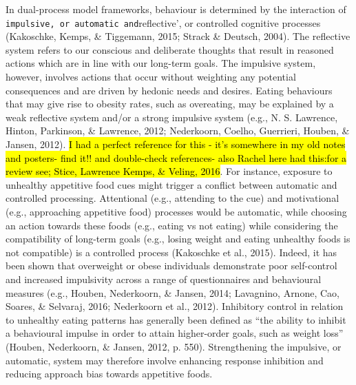 \documentclass[man,floatsintext]{apa6}
\begin{document}
\par

In dual-process model frameworks, behaviour is determined by the
interaction of
\texttt{impulsive\textquotesingle{},\ or\ automatic\ and}reflective', or
controlled cognitive processes (Kakoschke, Kemps, \& Tiggemann, 2015;
Strack \& Deutsch, 2004). The reflective system refers to our conscious
and deliberate thoughts that result in reasoned actions which are in
line with our long-term goals. The impulsive system, however, involves
actions that occur without weighting any potential consequences and are
driven by hedonic needs and desires. Eating behaviours that may give
rise to obesity rates, such as overeating, may be explained by a weak
reflective system and/or a strong impulsive system (e.g., N. S.
Lawrence, Hinton, Parkinson, \& Lawrence, 2012; Nederkoorn, Coelho,
Guerrieri, Houben, \& Jansen, 2012).
\hl{I had a perfect reference for this - it's somewhere in my old notes and posters- find it!! and double-check references- also Rachel here had this:for a review see; Stice, Lawrence Kemps, \& Veling, 2016}.
For instance, exposure to unhealthy appetitive food cues might trigger a
conflict between automatic and controlled processing. Attentional (e.g.,
attending to the cue) and motivational (e.g., approaching appetitive
food) processes would be automatic, while choosing an action towards
these foods (e.g., eating vs not eating) while considering the
compatibility of long-term goals (e.g., losing weight and eating
unhealthy foods is not compatible) is a controlled process (Kakoschke et
al., 2015). Indeed, it has been shown that overweight or obese
individuals demonstrate poor self-control and increased impulsivity
across a range of questionnaires and behavioural measures (e.g., Houben,
Nederkoorn, \& Jansen, 2014; Lavagnino, Arnone, Cao, Soares, \&
Selvaraj, 2016; Nederkoorn et al., 2012). Inhibitory control in relation
to unhealthy eating patterns has generally been defined as \enquote{the
ability to inhibit a behavioural impulse in order to attain higher-order
goals, such as weight loss} (Houben, Nederkoorn, \& Jansen, 2012, p.
550). Strengthening the impulsive, or automatic, system may therefore
involve enhancing response inhibition and reducing approach bias towards
appetitive foods.

\par
\end{document}
